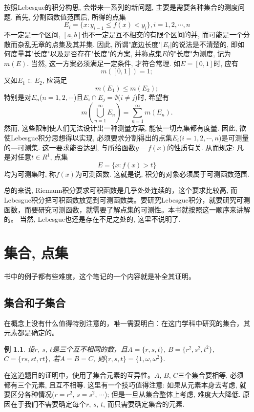 \documentclass[12pt,a4paper,openany]{book}
\newtheorem{example}{例}
\begin{document}
按照Lebesgue的积分构思, 会带来一系列的新问题, 主要是需要各种集合的测度问题. 首先, 分割函数值范围后, 所得的点集
$$
E_i = \{ x: y_{i-1} \le f(x) < y_i\}, i=1,2, \cdots, n
$$
不一定是一个区间, $[a, b]$也不一定是互不相交的有限个区间的并, 而可能是一个分散而杂乱无章的点集及其并集. 因此, 所谓"底边长度"$|E_i|$的说法是不清楚的, 即如何度量其"长度"以及是否存在"长度"的方案, 并称点集$E$的"长度"为测度, 记为$m(E)$. 当然, 这一方案必须满足一定条件, 才符合常理. 如$E = [0, 1]$时, 应有
$$
m([0, 1]) = 1;
$$
又如$E_1 \subset E_2$, 应满足
$$
m(E_1) \le m(E_2);
$$
特别是对$E_n$($n=1,2,\cdots$)且$E_i \cap E_j = \emptyset$($i \neq j$)时, 希望有
$$
m(\bigcup_{n=1}^{\infty}{E_n}) = \sum_{n=1}^{\infty}{m(E_n)}.
$$
然而, 这些限制使人们无法设计出一种测量方案, 能使一切点集都有度量. 因此, 欲使Lebesgue积分思想得以实现, 必须要求分割得出的点集$E_i$($i=1,2,\cdots, n$)是可测量的---可测集. 这一要求能否达到, 与所给函数$y = f(x)$的性质有关. 从而规定: 凡是对任意$t \in R^1$, 点集
$$
E = \{x: f(x) > t\}
$$
均为可测集时, 称$f(x)$为可测函数. 这就是说, 积分的对象必须属于可测函数范围.

总的来说, Riemann积分要求可积函数是几乎处处连续的，这个要求比较高, 而Lebesgue积分把可积函数放宽到可测函数类。要研究Lebesgue积分，就要研究可测函数，而要研究可测函数，就需要了解点集的可测性。本书就按照这一顺序来讲解的。 当然, Lebesgue也还是存在不足之处的, 这里不说明了.

\tableofcontents

\mainmatter

\chapter{集合, 点集}
书中的例子都有些难度，这个笔记的一个内容就是补全其证明。

\section{集合和子集合}
在概念上没有什么值得特别注意的，唯一需要明白：在这门学科中研究的集合，其元素都是确定的。

\begin{example}
设$r$, $s$, $t$是三个互不相同的数，且$A=\{r, s, t\}$, $B = \{r^2, s^2, t^2\}$, $C=\{rs, st, rt\}$, 若$A=B=C$, 则$\{r, s, t\} = \{1, \omega, \omega^2\}$.
\end{example}

在这道题目的证明中，使用了集合元素的互异性。$A$, $B$, $C$三个集合要相等, 必须都有三个元素, 且互不相等. 这里有一个技巧值得注意: 如果从元素本身去考虑, 就要区分各种情况($r = r^2$, $s = s^2$, $\cdots$); 但是一旦从集合整体上考虑, 难度大大降低. 原因在于我们不需要确定每个$r$, $s$, $t$, 而只需要确定集合的元素.
\end{document}

